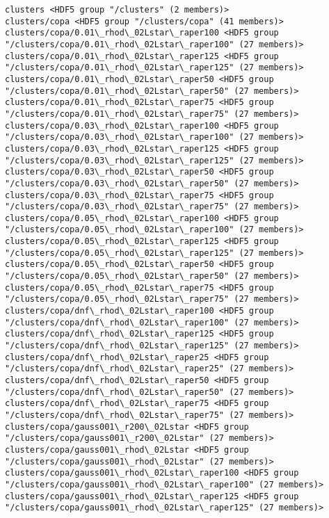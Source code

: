 \documentclass[11pt]{article}
\begin{document}
    \begin{Verbatim}[commandchars=\\\{\}]
clusters <HDF5 group "/clusters" (2 members)>
clusters/copa <HDF5 group "/clusters/copa" (41 members)>
clusters/copa/0.01\_rhod\_02Lstar\_raper100 <HDF5 group "/clusters/copa/0.01\_rhod\_02Lstar\_raper100" (27 members)>
clusters/copa/0.01\_rhod\_02Lstar\_raper125 <HDF5 group "/clusters/copa/0.01\_rhod\_02Lstar\_raper125" (27 members)>
clusters/copa/0.01\_rhod\_02Lstar\_raper50 <HDF5 group "/clusters/copa/0.01\_rhod\_02Lstar\_raper50" (27 members)>
clusters/copa/0.01\_rhod\_02Lstar\_raper75 <HDF5 group "/clusters/copa/0.01\_rhod\_02Lstar\_raper75" (27 members)>
clusters/copa/0.03\_rhod\_02Lstar\_raper100 <HDF5 group "/clusters/copa/0.03\_rhod\_02Lstar\_raper100" (27 members)>
clusters/copa/0.03\_rhod\_02Lstar\_raper125 <HDF5 group "/clusters/copa/0.03\_rhod\_02Lstar\_raper125" (27 members)>
clusters/copa/0.03\_rhod\_02Lstar\_raper50 <HDF5 group "/clusters/copa/0.03\_rhod\_02Lstar\_raper50" (27 members)>
clusters/copa/0.03\_rhod\_02Lstar\_raper75 <HDF5 group "/clusters/copa/0.03\_rhod\_02Lstar\_raper75" (27 members)>
clusters/copa/0.05\_rhod\_02Lstar\_raper100 <HDF5 group "/clusters/copa/0.05\_rhod\_02Lstar\_raper100" (27 members)>
clusters/copa/0.05\_rhod\_02Lstar\_raper125 <HDF5 group "/clusters/copa/0.05\_rhod\_02Lstar\_raper125" (27 members)>
clusters/copa/0.05\_rhod\_02Lstar\_raper50 <HDF5 group "/clusters/copa/0.05\_rhod\_02Lstar\_raper50" (27 members)>
clusters/copa/0.05\_rhod\_02Lstar\_raper75 <HDF5 group "/clusters/copa/0.05\_rhod\_02Lstar\_raper75" (27 members)>
clusters/copa/dnf\_rhod\_02Lstar\_raper100 <HDF5 group "/clusters/copa/dnf\_rhod\_02Lstar\_raper100" (27 members)>
clusters/copa/dnf\_rhod\_02Lstar\_raper125 <HDF5 group "/clusters/copa/dnf\_rhod\_02Lstar\_raper125" (27 members)>
clusters/copa/dnf\_rhod\_02Lstar\_raper25 <HDF5 group "/clusters/copa/dnf\_rhod\_02Lstar\_raper25" (27 members)>
clusters/copa/dnf\_rhod\_02Lstar\_raper50 <HDF5 group "/clusters/copa/dnf\_rhod\_02Lstar\_raper50" (27 members)>
clusters/copa/dnf\_rhod\_02Lstar\_raper75 <HDF5 group "/clusters/copa/dnf\_rhod\_02Lstar\_raper75" (27 members)>
clusters/copa/gauss001\_r200\_02Lstar <HDF5 group "/clusters/copa/gauss001\_r200\_02Lstar" (27 members)>
clusters/copa/gauss001\_rhod\_02Lstar <HDF5 group "/clusters/copa/gauss001\_rhod\_02Lstar" (27 members)>
clusters/copa/gauss001\_rhod\_02Lstar\_raper100 <HDF5 group "/clusters/copa/gauss001\_rhod\_02Lstar\_raper100" (27 members)>
clusters/copa/gauss001\_rhod\_02Lstar\_raper125 <HDF5 group "/clusters/copa/gauss001\_rhod\_02Lstar\_raper125" (27 members)>

\end{Verbatim}
\end{document}
